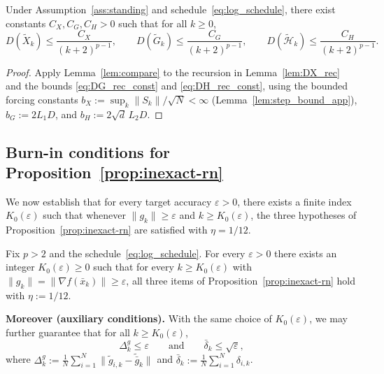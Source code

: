 \documentclass[review,onefignum,onetabnum]{siamart171218}
\begin{document}
	\begin{proposition}\label{prop:dispersion_decay}
		Under Assumption~\ref{ass:standing} and schedule~\eqref{eq:log_schedule},
		there exist constants $C_X,C_G,C_H>0$ such that for all $k\ge0$,
		\[
		D(\tilde X_k)\le \frac{C_X}{(k+2)^{p-1}},
		\qquad
		D(\tilde G_k)\le \frac{C_G}{(k+2)^{p-1}},
		\qquad
		D(\tilde{\mathcal H}_k)\le \frac{C_H}{(k+2)^{p-1}}.
		\]
	\end{proposition}
	\begin{proof}
		Apply Lemma~\ref{lem:compare} to the recursion in Lemma~\ref{lem:DX_rec} and the bounds \eqref{eq:DG_rec_const} and \eqref{eq:DH_rec_const},
		using the bounded forcing constants $b_X:=\sup_k\|S_k\|/\sqrt N<\infty$ (Lemma~\ref{lem:step_bound_app}),
		$b_G:=2L_1D$, and $b_H:=2\sqrt d\,L_2D$.
	\end{proof}
	
	\subsection{Burn-in conditions for Proposition~\ref{prop:inexact-rn}}
	
	We now establish that for every target accuracy $\varepsilon>0$, there
	exists a finite index $K_0(\varepsilon)$ such that whenever
	$\|g_k\|\ge\varepsilon$ and $k\ge K_0(\varepsilon)$,
	the three hypotheses of Proposition~\ref{prop:inexact-rn} are
	satisfied with $\eta=1/12$.
	\begin{proposition}\label{prop:burnin}
		Fix $p>2$ and the schedule~\eqref{eq:log_schedule}.
		For every $\varepsilon>0$ there exists an integer $K_0(\varepsilon)\ge0$ such that
		for every $k\ge K_0(\varepsilon)$ with $\|g_k\|=\|\nabla f(\bar x_k)\|\ge \varepsilon$,
		all three items of Proposition~\ref{prop:inexact-rn} hold with $\eta:=1/12$.
		
		\smallskip
		\noindent\textbf{Moreover (auxiliary conditions).}
		With the same choice of $K_0(\varepsilon)$, we may further guarantee that for all $k\ge K_0(\varepsilon)$,
		\begin{equation}\label{eq:burnin_aux_enforce}
			\Delta_k^g \le \varepsilon
			\qquad\text{and}\qquad
			\bar\delta_k \le \sqrt{\varepsilon},
		\end{equation}
		where $\Delta_k^g:=\frac1N\sum_{i=1}^N\|\tilde g_{i,k}-\tilde{\bar g}_k\|$ and $\bar\delta_k:=\frac1N\sum_{i=1}^N\delta_{i,k}$.
	\end{proposition}
	
\end{document}
